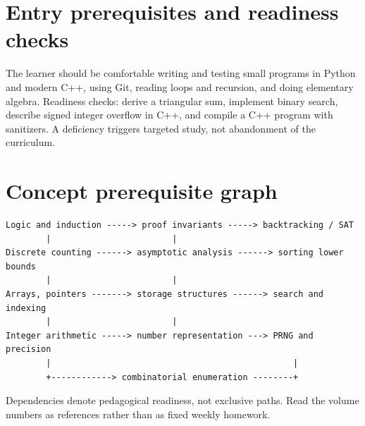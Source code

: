 \documentclass[11pt,letterpaper]{article}
\begin{document}
\tableofcontents
\clearpage
{}
\section{Entry prerequisites and readiness checks}
The learner should be comfortable writing and testing small programs in Python and modern C++, using Git, reading loops and recursion, and doing elementary algebra. Readiness checks: derive a triangular sum, implement binary search, describe signed integer overflow in C++, and compile a C++ program with sanitizers. A deficiency triggers targeted study, not abandonment of the curriculum.
\section{Concept prerequisite graph}
\begin{verbatim}
Logic and induction -----> proof invariants -----> backtracking / SAT
        |                        |
Discrete counting ------> asymptotic analysis ------> sorting lower bounds
        |                        |
Arrays, pointers -------> storage structures ------> search and indexing
        |                        |
Integer arithmetic -----> number representation ---> PRNG and precision
        |                                                |
        +------------> combinatorial enumeration --------+
\end{verbatim}
Dependencies denote pedagogical readiness, not exclusive paths. Read the volume numbers as references rather than as fixed weekly homework.
\end{document}
